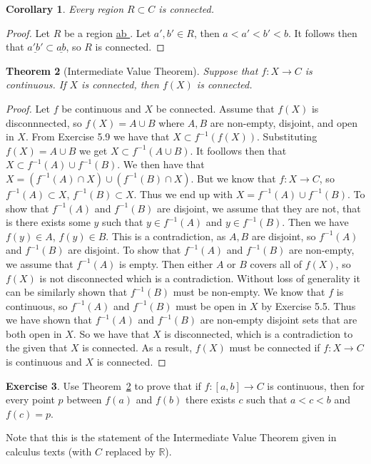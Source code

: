 \documentclass[12pt]{article}
\newcommand{\bbR}{\mathbb{R}}
\providecommand{\arr}{\to}
\renewcommand{\_}[1]{\underline{ #1 }}
\newtheorem{theorem}{Theorem}[section]
\newtheorem{corollary}[theorem]{Corollary}
\theoremstyle{definition}
\newtheorem{exercise}[theorem]{Exercise}
\numberwithin{equation}{subsection}
\begin{document}
\begin{corollary}
Every region $R\subset C$ is connected.
\end{corollary}

\begin{proof}
Let $R$ be a region \_{ab}. Let $a',b' \in R$, then $a < a' < b' < b$. It follows then that $\_{a'b'} \subset \_{ab}$, so $R$ is connected.
\end{proof}

\begin{theorem}[Intermediate Value Theorem]\label{int_value_thm}
Suppose that $f \colon X \arr C$ is continuous.  If $X$ is connected, then $f(X)$ is connected.
\end{theorem}

\begin{proof}
Let $f$ be continuous and $X$ be connected. Assume that $f(X)$ is disconnnected, so $f(X) = A \cup B$ where $A,B$ are non-empty, disjoint, and open in $X$. From Exercise 5.9 we have that $X \subset f^{-1}(f(X))$. Substituting $f(X) = A \cup B$ we get $X \subset f^{-1}(A \cup B)$. It foollows then that $X \subset f^{-1}(A) \cup f^{-1}(B)$. We then have that $X = (f^{-1}(A) \cap X) \cup (f^{-1}(B) \cap X)$. But we know that $f: X \to C$, so $f^{-1}(A) \subset X$, $f^{-1}(B) \subset X$. Thus we end up with $X = f^{-1}(A) \cup f^{-1}(B)$. To show that $f^{-1}(A)$ and $f^{-1}(B)$ are disjoint, we assume that they are not, that is there exists some $y$ such that $y \in f^{-1}(A)$ and $y \in f^{-1}(B)$. Then we have $f(y) \in A$, $f(y) \in B$. This is a contradiction, as $A,B$ are disjoint, so $f^{-1}(A)$ and $f^{-1}(B)$ are disjoint. To show that $f^{-1}(A)$ and $f^{-1}(B)$ are non-empty, we assume that $f^{-1}(A)$ is empty. Then either $A$ or $B$ covers all of $f(X)$, so $f(X)$ is not disconnected which is a contradiction. Without loss of generality it can be similarly shown that $f^{-1}(B)$ must be non-empty. We know that $f$ is continuous, so $f^{-1}(A)$ and $f^{-1}(B)$ must be open in $X$ by Exercise 5.5. Thus we have shown that $f^{-1}(A)$ and $f^{-1}(B)$ are non-empty disjoint sets that are both open in $X$. So we have that $X$ is disconnected, which is a contradiction to the given that $X$ is connected. As a result, $f(X)$ must be connected if $f : X \to C$ is continuous and $X$ is connected.
\end{proof}

\begin{exercise}  
Use Theorem~\ref{int_value_thm} to prove that if $f\colon [a,b] \arr C $ is continuous, then for every point $p$ between $f(a)$ and $f(b)$ there exists $c$ such that $a<c<b$ and $f(c)=p$. 

Note that this is the statement of the Intermediate Value Theorem given in calculus texts (with $C$ replaced by $\bbR$).
\end{exercise}
\end{document}
